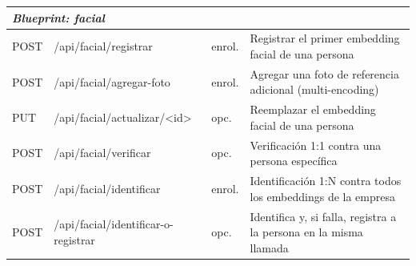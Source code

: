 \documentclass{iccmemoria}
\begin{document}
\begin{longtable}{|p{1.5cm}|p{5.2cm}|p{1.2cm}|p{5.3cm}|}
\multicolumn{4}{|l|}{\textit{Blueprint: facial}} \\
\hline
POST & /api/facial/registrar & enrol. & Registrar el primer embedding facial de una persona \\
POST & /api/facial/agregar-foto & enrol. & Agregar una foto de referencia adicional (multi-encoding) \\
PUT & /api/\allowbreak facial/\allowbreak actualizar/\allowbreak <id> & opc. & Reemplazar el embedding facial de una persona \\
POST & /api/facial/verificar & opc. & Verificación 1:1 contra una persona específica \\
POST & /api/facial/identificar & enrol. & Identificación 1:N contra todos los embeddings de la empresa \\
POST & /api/\allowbreak facial/\allowbreak identificar-o-registrar & opc. & Identifica y, si falla, registra a la persona en la misma llamada \\
\hline


\end{longtable}
\end{document}
